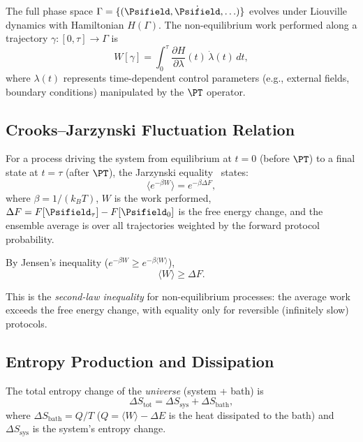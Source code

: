 The full phase space \(\Gamma=\{(\Psifield,\dot{\Psifield},\ldots)\}\) evolves under Liouville dynamics with Hamiltonian \(H(\Gamma)\). The non-equilibrium work performed along a trajectory \(\gamma:[0,\tau]\to\Gamma\) is
\begin{equation}
W[\gamma] = \int_0^\tau \frac{\partial H}{\partial\lambda}(t)\,\dot{\lambda}(t)\,dt,
\end{equation}
where \(\lambda(t)\) represents time-dependent control parameters (e.g., external fields, boundary conditions) manipulated by the \(\PT\) operator.

\subsection{Crooks--Jarzynski Fluctuation Relation}

For a process driving the system from equilibrium at \(t=0\) (before \(\PT\)) to a final state at \(t=\tau\) (after \(\PT\)), the Jarzynski equality~\cite{Jarzynski1997} states:
\begin{equation}
\langle e^{-\beta W} \rangle = e^{-\beta \Delta F},
\end{equation}
where \(\beta=1/(k_B T)\), \(W\) is the work performed, \(\Delta F = F[\Psifield_\tau] - F[\Psifield_0]\) is the free energy change, and the ensemble average is over all trajectories weighted by the forward protocol probability.

By Jensen's inequality (\(e^{-\beta W}\ge e^{-\beta\langle W\rangle}\)),
\begin{equation}
\langle W \rangle \ge \Delta F.
\label{eq:jarzynski-ineq}
\end{equation}

This is the \emph{second-law inequality} for non-equilibrium processes: the average work exceeds the free energy change, with equality only for reversible (infinitely slow) protocols.

\subsection{Entropy Production and Dissipation}

The total entropy change of the \emph{universe} (system + bath) is
\begin{equation}
\Delta S_{\mathrm{tot}} = \Delta S_{\mathrm{sys}} + \Delta S_{\mathrm{bath}},
\end{equation}
where \(\Delta S_{\mathrm{bath}} = Q/T\) (\(Q=\langle W\rangle - \Delta E\) is the heat dissipated to the bath) and \(\Delta S_{\mathrm{sys}}\) is the system's entropy change.

